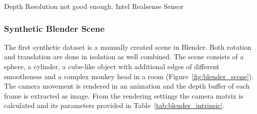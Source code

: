 Depth Resolution not good enough.
Intel Realsense Sensor

\subsubsection{Synthetic Blender Scene}

The first synthetic dataset is a manually created scene in Blender\cite{blender}.
Both rotation and translation are done in isolation as well combined.
The scene consists of a sphere, a cylinder, a cube-like object with additional edges of different smootheness and a complex monkey head in a room (Figure~\ref{fig:blender_scene}).
The camera movement is rendered in an animation and the depth buffer of each frame is extracted as image.
From the rendering settings the camera matrix is calculated and its parameters provided in Table~\ref{tab:blender_intrinsic}.
